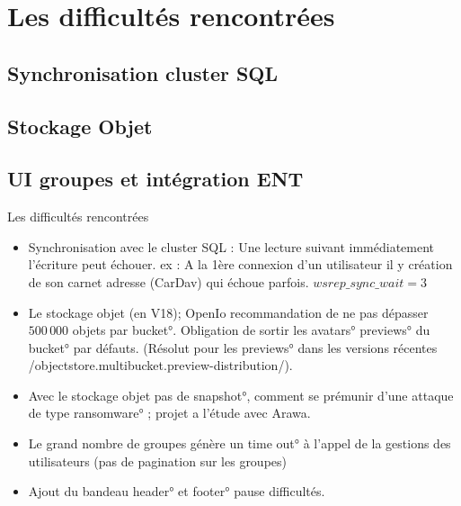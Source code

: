 
\section{Les difficultés rencontrées}
\subsection{Synchronisation cluster SQL}
\subsection{Stockage Objet}
\subsection{UI groupes et intégration ENT}
\begin{frame}[fragile]{Les difficultés rencontrées}

\begin{itemize}
	\item Synchronisation avec le cluster SQL : Une lecture suivant immédiatement l'écriture peut échouer.  
	ex : A la 1ère connexion d'un utilisateur il y création de son carnet adresse (CarDav) qui échoue parfois.
		$wsrep\_sync\_wait = 3$
\end{itemize}
\begin{itemize}

\item Le stockage objet (en \small{V18});  OpenIo recommandation de ne pas dépasser $500\,000$ objets par \ang{bucket}. Obligation de sortir les \ang{avatars} \ang{previews} du \ang{bucket} par défauts. (Résolut pour les \ang{previews} dans les versions récentes \code/objectstore.multibucket.preview-distribution/).

\item Avec le stockage objet pas de \ang{snapshot}, comment se prémunir d'une attaque de type \ang{ransomware} ; projet a l'étude avec Arawa. 

\end{itemize}


\begin{itemize}
 \item Le grand nombre de groupes génère un \ang{time out} à l'appel de la gestions des utilisateurs (pas de pagination sur les groupes)
 \item Ajout du bandeau \ang{header} et \ang{footer} pause difficultés. 
\end{itemize}

\end{frame}
